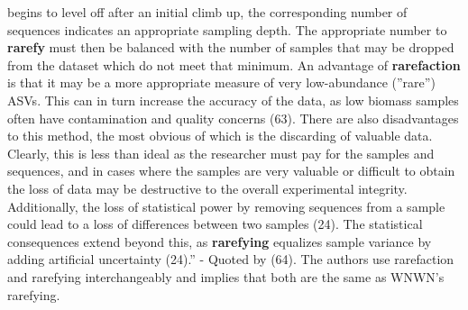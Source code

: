 \documentclass[
]{article}
\begin{document}
\begin{itemize}
  begins to level off after an initial climb up, the corresponding
  number of sequences indicates an appropriate sampling depth. The
  appropriate number to \textbf{rarefy} must then be balanced with the
  number of samples that may be dropped from the dataset which do not
  meet that minimum. An advantage of \textbf{rarefaction} is that it may
  be a more appropriate measure of very low-abundance (''rare'') ASVs.
  This can in turn increase the accuracy of the data, as low biomass
  samples often have contamination and quality concerns (63). There are
  also disadvantages to this method, the most obvious of which is the
  discarding of valuable data. Clearly, this is less than ideal as the
  researcher must pay for the samples and sequences, and in cases where
  the samples are very valuable or difficult to obtain the loss of data
  may be destructive to the overall experimental integrity.
  Additionally, the loss of statistical power by removing sequences from
  a sample could lead to a loss of differences between two samples (24).
  The statistical consequences extend beyond this, as \textbf{rarefying}
  equalizes sample variance by adding artificial uncertainty (24).'' -
  Quoted by (64). The authors use rarefaction and rarefying
  interchangeably and implies that both are the same as WNWN's
  rarefying.
\end{itemize}
\end{document}
